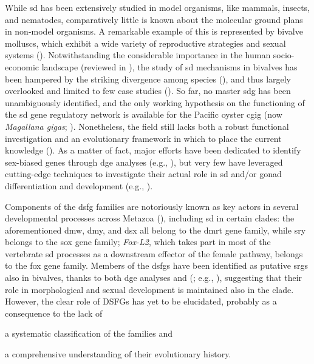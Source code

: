 While \gls{sd} has been extensively studied in model organisms, like mammals, insects, and nematodes, comparatively little is known about the molecular ground plans in non-model organisms. A remarkable example of this is represented by bivalve molluscs, which exhibit a wide variety of reproductive strategies and sexual systems (). Notwithstanding the considerable importance in the human socio-economic landscape (reviewed in ), the study of \gls{sd} mechanisms in bivalves has been hampered by the striking divergence among species (), and thus largely overlooked and limited to few case studies (). So far, no master \gls{sdg} has been unambiguously identified, and the only working hypothesis on the functioning of the \gls{sd} gene regulatory network is available for the Pacific oyster \gls{cgig} (now \textit{Magallana gigas}; ). Nonetheless, the field still lacks both a robust functional investigation and an evolutionary framework in which to place the current knowledge (). As a matter of fact, major efforts have been dedicated to identify sex-biased genes through \gls{dge} analyses (e.g., ), but very few have leveraged cutting-edge techniques to investigate their actual role in \gls{sd} and/or gonad differentiation and development (e.g., ).

Components of the \gls{dsfg} families are notoriously known as key actors in several developmental processes across Metazoa (), including \gls{sd} in certain clades: the aforementioned \gls{dmw}, \gls{dmy}, and \gls{dsx} all belong to the \gls{dmrt} gene family, while \gls{sry} belongs to the \gls{sox} gene family; \textit{Fox-L2}, which takes part in most of the vertebrate \gls{sd} processes as a downstream effector of the female pathway, belongs to the \gls{fox} gene family. Members of the \glspl{dsfg} have been identified as putative \glspl{srg} also in bivalves, thanks to both \gls{dge} analyses and  (; e.g., ), suggesting that their role in morphological and sexual development is maintained also in the clade. However, the clear role of DSFGs has yet to be elucidated, probably as a consequence to the lack of
\begin{inlinelist}
	\item a systematic classification of the families and
	\item a comprehensive understanding of their evolutionary history.
\end{inlinelist}

